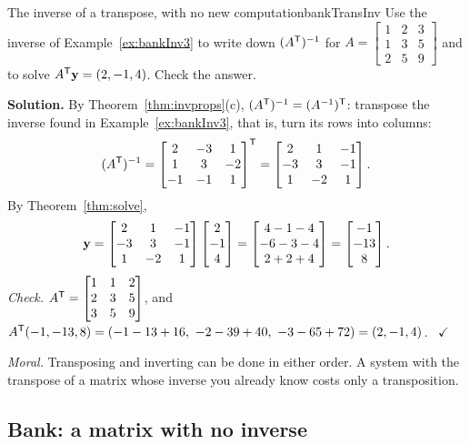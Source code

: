 \documentclass[11pt]{article}
\begin{document}
\begin{exmp}{The inverse of a transpose, with no new computation}{bankTransInv}
Use the inverse of Example~\ref{ex:bankInv3} to write down $(A^{\mathsf T})^{-1}$ for $A=\begin{bmatrix}1&2&3\\1&3&5\\2&5&9\end{bmatrix}$ and to solve $A^{\mathsf T}\mathbf{y}=(2,-1,4)$. Check the answer.

\textbf{Solution.} By Theorem~\ref{thm:invprops}(c), $(A^{\mathsf T})^{-1}=(A^{-1})^{\mathsf T}$: transpose the inverse found in Example~\ref{ex:bankInv3}, that is, turn its rows into columns:
\[
(A^{\mathsf T})^{-1}=\begin{bmatrix}2&-3&1\\1&3&-2\\-1&-1&1\end{bmatrix}^{\mathsf T}=\begin{bmatrix}2&1&-1\\-3&3&-1\\1&-2&1\end{bmatrix}.
\]
By Theorem~\ref{thm:solve},
\[
\mathbf{y}=\begin{bmatrix}2&1&-1\\-3&3&-1\\1&-2&1\end{bmatrix}\begin{bmatrix}2\\-1\\4\end{bmatrix}=\begin{bmatrix}4-1-4\\-6-3-4\\2+2+4\end{bmatrix}=\begin{bmatrix}-1\\-13\\8\end{bmatrix}.
\]
\emph{Check.} $A^{\mathsf T}=\begin{bmatrix}1&1&2\\2&3&5\\3&5&9\end{bmatrix}$, and $A\T(-1,-13,8)=(-1-13+16,\ -2-39+40,\ -3-65+72)=(2,-1,4)$. \ $\checkmark$

\emph{Moral.} Transposing and inverting can be done in either order. A system with the transpose of a matrix whose inverse you already know costs only a transposition.
\end{exmp}

\subsection*{Bank: a matrix with no inverse}
\end{document}
